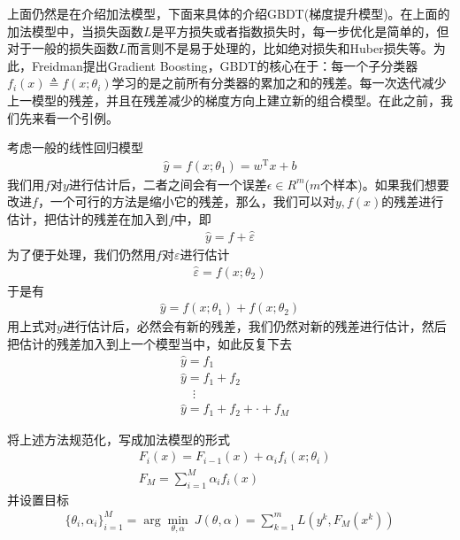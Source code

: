           \par
          上面仍然是在介绍加法模型，下面来具体的介绍GBDT(梯度提升模型)。在上面的加法模型中，当损失函数$L$是平方损失或者指数损失时，每一步优化是简单的，但对于一般的损失函数$L$而言则不是易于处理的，比如绝对损失和Huber损失等。为此，Freidman提出Gradient Boosting\cite{2000.Frie}，GBDT的核心在于：每一个子分类器$f_i(x) \triangleq f(x;\theta_i)$学习的是之前所有分类器的累加之和的残差。每一次迭代减少上一模型的残差，并且在残差减少的梯度方向上建立新的组合模型。在此之前，我们先来看一个引例。
          \par
          考虑一般的线性回归模型
          \begin{align*}
          \hat{y} = f(x;\theta_1) = w^\mathrm{T}x + b
          \end{align*}
          我们用$f$对$y$进行估计后，二者之间会有一个误差$\epsilon\in R^m$($m$个样本)。如果我们想要改进$f$，一个可行的方法是缩小它的残差，那么，我们可以对$y,f(x)$的残差进行估计，把估计的残差在加入到$f$中，即
          \begin{align*}
          \hat{y} = f+\hat{\varepsilon}
          \end{align*}
          为了便于处理，我们仍然用$f$对$\varepsilon$进行估计
          \begin{align*}
          \hat{\varepsilon} = f(x;\theta_2)
          \end{align*}
          于是有
          \begin{align*}
          \hat{y} = f(x;\theta_1)+f(x;\theta_2)
          \end{align*}
          用上式对$y$进行估计后，必然会有新的残差，我们仍然对新的残差进行估计，然后把估计的残差加入到上一个模型当中，如此反复下去
          \begin{align*}
          & \hat{y} = f_1\\
          & \hat{y} = f_1+f_2\\
          & \quad \vdots\\
          & \hat{y} = f_1+f_2+\cdot+f_M
          \end{align*}
          \par
          将上述方法规范化，写成加法模型的形式
          \begin{align*}
          & F_i(x) =F_{i-1}(x)+\alpha_if_i(x;\theta_i)\\
          & F_M = \sum_{i=1}^M \alpha_i f_i(x)
          \end{align*}
          并设置目标
          \begin{align*}
          \{\theta_i,\alpha_i\}_{i=1}^M = \arg\min_{\theta,\alpha} \ J(\theta,\alpha) = \sum_{k=1}^m L(y^k,F_M(x^k))
          \end{align*}
